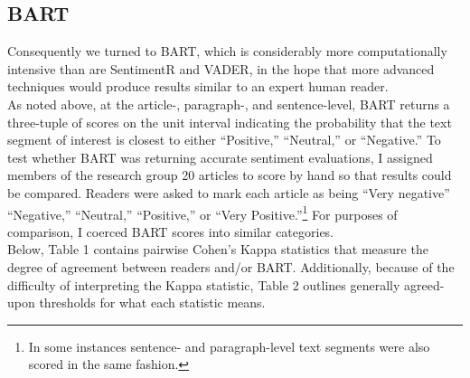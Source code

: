\documentclass[11pt, letterpaper, twoside]{article}
\begin{document}
    \subsection{BART}
        Consequently we turned to BART, which is considerably more computationally intensive than are SentimentR and VADER, in the hope that more advanced techniques would produce results similar to an expert human reader.\\

        As noted above, at the article-, paragraph-, and sentence-level, BART returns a three-tuple of scores on the unit interval indicating the probability that the text segment of interest is closest to either ``Positive,'' ``Neutral,'' or ``Negative.'' To test whether BART was returning accurate sentiment evaluations, I assigned members of the research group 20 articles to score by hand so that results could be compared. Readers were asked to mark each article as being ``Very negative'' ``Negative,'' ``Neutral,'' ``Positive,'' or ``Very Positive.''\footnote{In some instances sentence- and paragraph-level text segments were also scored in the same fashion.} For purposes of comparison, I coerced BART scores into similar categories.\\

        Below, Table 1 contains pairwise Cohen's Kappa statistics that measure the degree of agreement between readers and/or BART. Additionally, because of the difficulty of interpreting the Kappa statistic, Table 2 outlines generally agreed-upon thresholds for what each statistic means.
\end{document}
